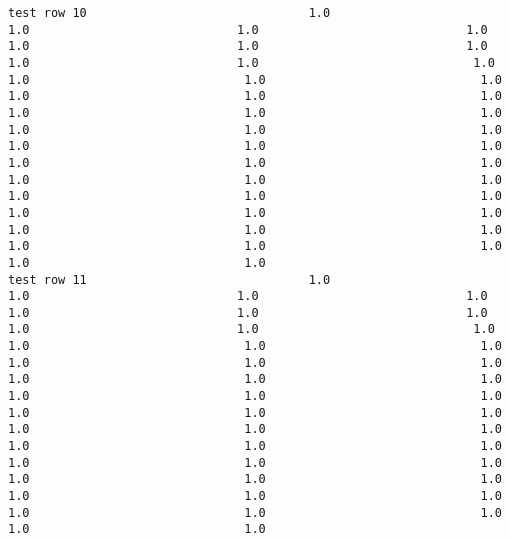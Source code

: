 \documentclass[11pt]{article}
\begin{document}
\begin{verbatim}
test row 10                               1.0                             1.0                             1.0                             1.0                             1.0                             1.0                             1.0                             1.0                             1.0                              1.0                              1.0                              1.0                              1.0                              1.0                              1.0                              1.0                              1.0                              1.0                              1.0                              1.0                              1.0                              1.0                              1.0                              1.0                              1.0                              1.0                              1.0                              1.0                              1.0                              1.0                              1.0                              1.0                              1.0                              1.0                              1.0                              1.0                              1.0                              1.0                              1.0                              1.0                              1.0                              1.0                              1.0                              1.0                              1.0
test row 11                               1.0                             1.0                             1.0                             1.0                             1.0                             1.0                             1.0                             1.0                             1.0                              1.0                              1.0                              1.0                              1.0                              1.0                              1.0                              1.0                              1.0                              1.0                              1.0                              1.0                              1.0                              1.0                              1.0                              1.0                              1.0                              1.0                              1.0                              1.0                              1.0                              1.0                              1.0                              1.0                              1.0                              1.0                              1.0                              1.0                              1.0                              1.0                              1.0                              1.0                              1.0                              1.0                              1.0                              1.0                              1.0

\end{verbatim}
\end{document}
